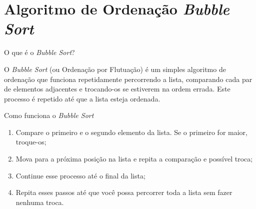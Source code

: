 \section{Algoritmo de Ordenação \textit{Bubble Sort}}

\begin{frame}{O que é o \textit{Bubble Sort}?}

O \textit{Bubble Sort} (ou Ordenação por Flutuação) é um simples algoritmo de
ordenação que funciona repetidamente percorrendo a lista, comparando cada par
de elementos adjacentes e trocando-os se estiverem na ordem errada. Este
processo é repetido até que a lista esteja ordenada.

\end{frame}

\begin{frame}{Como funciona o \textit{Bubble Sort}}
    \begin{enumerate}
        \item Compare o primeiro e o segundo elemento da lista.
              Se o primeiro for maior, troque-os;
        \item Mova para a próxima posição na lista e repita a comparação e
              possível troca;
        \item Continue esse processo até o final da lista;
        \item Repita esses passos até que você possa percorrer toda a lista sem
              fazer nenhuma troca.
    \end{enumerate}
\end{frame}
